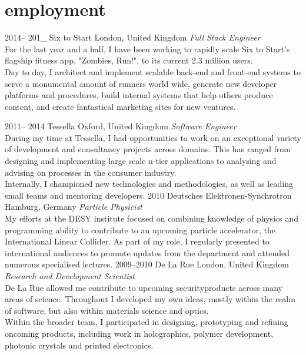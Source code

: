 \documentclass[]{friggeri-cv} %
\begin{document}

\section{employment}

\begin{entrylist}

\entry
{2014-- 201\_ }
{Six to Start}
{London, United Kingdom}
{\emph{Full Stack Engineer} \\
For the last year and a half, I have been working to rapidly scale Six to Start's flagship fitness app, "Zombies, Run!", to its current 2.3 million users. \\
Day to day, I architect and implement scalable back-end and front-end systems to serve a monumental amount of runners world wide, generate new developer platforms and procedures, build internal systems that help others produce content, and create fantastical marketing sites for new ventures. }


\entry
{2011-- 2014 }
{Tessella}
{Oxford, United Kingdom}
{\emph{Software Engineer} \\
During my time at Tessella, I had opportunities to work on an exceptional variety of development and consultancy projects across domains. This has ranged from designing and implementing large scale n-tier applications to analysing and advising on processes in the consumer industry.\\
Internally, I championed new technologies and methodologies, as well as leading small teams and mentoring developers.}
\entry
{2010}
{Deutsches Elektronen-Synchrotron}
{Hamburg, Germany}
{\emph{Particle Physicist} \\
My efforts at the DESY institute focused on combining knowledge of physics and programming ability to contribute to an upcoming particle accelerator, the International Linear Collider. As part of my role, I regularly presented to international audiences to promote updates from the department and attended numerous specialised lectures.}
\entry
{2009--2010}
{De La Rue}
{London, United Kingdom}
{\emph{Research and Development Scientist} \\
De La Rue allowed me contribute to upcoming securityproducts across many areas of science. Throughout I developed my own ideas, mostly within the realm of software, but also within materials science and optics. \\
Within the broader team, I participated in designing, prototyping and refining oncoming products, including work in holographics, polymer development, photonic crystals and printed electronics. }

\end{entrylist}
\end{document}
